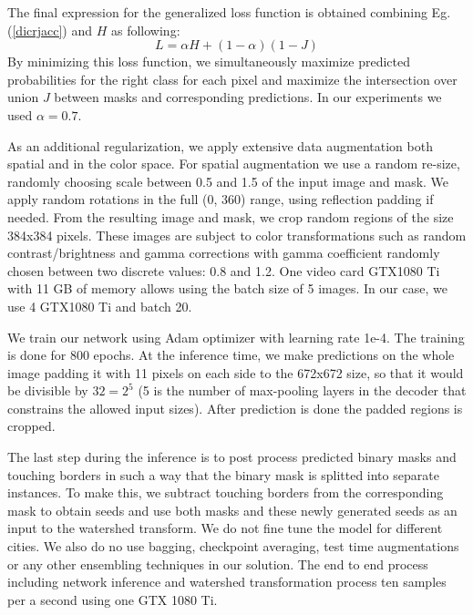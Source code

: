 \documentclass[10pt,twocolumn,letterpaper]{article}
\begin{document}
The final expression for the generalized loss function is obtained combining Eg. (\ref{dicrjacc}) and $H$ as following:
\begin{equation}
\label{free_en}
L=\alpha H +(1-\alpha)(1-J)
\end{equation}
By minimizing this loss function, we simultaneously maximize predicted probabilities for the right class for each pixel and maximize the intersection over union $J$ between masks and corresponding predictions. In our experiments we used $\alpha = 0.7$. 

As an additional regularization, we apply extensive data augmentation both spatial and in the color space. For spatial augmentation we use a random re-size, randomly choosing scale between 0.5 and 1.5 of the input image and mask. We apply random rotations in the full (0, 360) range, using reflection padding if needed. From the resulting image and mask, we crop random regions of the size 384x384 pixels. These images are subject to color transformations such as random contrast/brightness and gamma corrections with gamma coefficient randomly chosen between two discrete values: 0.8 and 1.2. One video card GTX1080 Ti with 11 GB of memory allows using the batch size of 5 images. In our case, we use 4 GTX1080 Ti and batch 20. 

We train our network using Adam optimizer with learning rate 1e-4. The training is done for 800 epochs. At the inference time, we make predictions on the whole image padding it with 11 pixels on each side to the 672x672 size, so that it would be divisible by $32=2^5$ (5 is the number of max-pooling layers in the decoder that constrains the allowed input sizes). After prediction is done the padded regions is cropped. 

The last step during the inference is to post process predicted binary masks and touching borders in such a way that the binary mask is splitted into separate instances. To make this, we subtract touching borders from the corresponding mask to obtain seeds and use both masks and these newly generated seeds as an input to the watershed transform. We do not fine tune the model for different cities. We also do no use bagging, checkpoint averaging, test time augmentations or any other ensembling techniques in our solution. The end to end process including network inference and watershed transformation process ten samples per a second using one GTX 1080 Ti.
\end{document}
